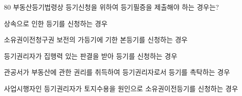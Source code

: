 \begin{question}{80}
부동산등기법령상 등기신청을 위하여 등기필증을 제출해야 하는 경우는?
\begin{choices}
  \item 상속으로 인한 등기를 신청하는 경우
  \item 소유권이전청구권 보전의 가등기에 기한 본등기를 신청하는 경우
  \item 등기권리자가 집행력 있는 판결을 받아 등기를 신청하는 경우
  \item 관공서가 부동산에 관한 권리를 취득하여 등기권리자로서 등기를 촉탁하는 경우
  \item 사업시행자인 등기권리자가 토지수용을 원인으로 소유권이전등기를 신청하는 경우
\end{choices}
\end{question}
